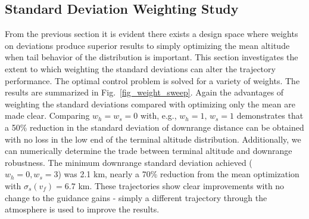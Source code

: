 \documentclass[journal ]{new-aiaa}
\begin{document}
\subsection*{Standard Deviation Weighting Study}
From the previous section it is evident there exists a design space where weights on deviations produce superior results to simply optimizing the mean altitude when tail behavior of the distribution is important. This section investigates the extent to which weighting the standard deviations can alter the trajectory performance. The optimal control problem is solved for a variety of weights. The results are summarized in Fig.~\ref{fig_weight_sweep}. Again the advantages of weighting the standard deviations compared with optimizing only the mean are made clear. Comparing $w_h=w_s=0$ with, e.g., $w_h=1,\,w_s = 1$ demonstrates that a 50\% reduction in the standard deviation of downrange distance can be obtained with no loss in the low end of the terminal altitude distribution. Additionally, we can numerically determine the trade between terminal altitude and downrange robustness. The minimum downrange standard deviation achieved ($w_h=0,w_s=3$) was 2.1 km, nearly a 70\% reduction from the mean optimization with $\sigma_s(v_f)=6.7$ km. These trajectories show clear improvements with no change to the guidance gains - simply a different trajectory through the atmosphere is used to improve the results.

\end{document}

